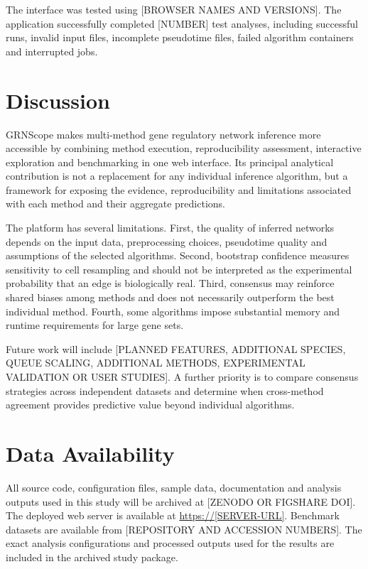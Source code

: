 \documentclass[unnumsec,webpdf,modern,large]{oup-authoring-template}%
\begin{document}
The interface was tested using [BROWSER NAMES AND VERSIONS]. The application successfully completed [NUMBER] test analyses, including successful runs, invalid input files, incomplete pseudotime files, failed algorithm containers and interrupted jobs.

\section{Discussion}

GRNScope makes multi-method gene regulatory network inference more accessible by combining method execution, reproducibility assessment, interactive exploration and benchmarking in one web interface. Its principal analytical contribution is not a replacement for any individual inference algorithm, but a framework for exposing the evidence, reproducibility and limitations associated with each method and their aggregate predictions.

The platform has several limitations. First, the quality of inferred networks depends on the input data, preprocessing choices, pseudotime quality and assumptions of the selected algorithms. Second, bootstrap confidence measures sensitivity to cell resampling and should not be interpreted as the experimental probability that an edge is biologically real. Third, consensus may reinforce shared biases among methods and does not necessarily outperform the best individual method. Fourth, some algorithms impose substantial memory and runtime requirements for large gene sets.

Future work will include [PLANNED FEATURES, ADDITIONAL SPECIES, QUEUE SCALING, ADDITIONAL METHODS, EXPERIMENTAL VALIDATION OR USER STUDIES]. A further priority is to compare consensus strategies across independent datasets and determine when cross-method agreement provides predictive value beyond individual algorithms.

\section{Data Availability}

All source code, configuration files, sample data, documentation and analysis outputs used in this study will be archived at [ZENODO OR FIGSHARE DOI]. The deployed web server is available at \url{https://[SERVER-URL]}. Benchmark datasets are available from [REPOSITORY AND ACCESSION NUMBERS]. The exact analysis configurations and processed outputs used for the results are included in the archived study package.
\end{document}
